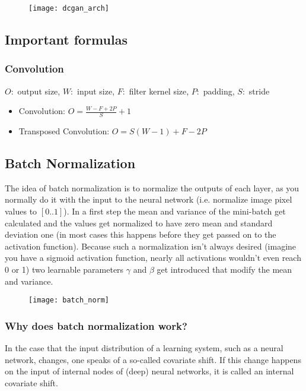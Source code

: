 \begin{figure}
	\centering
		\texttt{[image: dcgan\_arch]}
	\label{fig:dcgan_arch}
\end{figure}

\subsection{Important formulas}
\subsubsection{Convolution}
$O:$ output size, $W:$ input size, $F:$ filter kernel size, $P:$ padding, $S:$ stride
\begin{itemize}
	\item
		Convolution: $O = \frac{W - F + 2P}{S} + 1$
	\item
		Transposed Convolution: $O = S(W-1) + F - 2P$
\end{itemize}

\subsection{Batch Normalization}
The idea of batch normalization is to normalize the outputs of each layer, as you normally do it with the input to the neural network (i.e. normalize image pixel values to $[0..1]$). In a first step the mean and variance of the mini-batch get calculated and the values get normalized to have zero mean and standard deviation one (in most cases this happens before they get passed on to the activation function). Because such a normalization isn't always desired (imagine you have a sigmoid activation function, nearly all activations wouldn't even reach 0 or 1) two learnable parameters $\gamma$ and $\beta$ get introduced that modify the mean and variance.
\begin{figure}
	\centering
		\texttt{[image: batch\_norm]}
	\caption{}
	\label{fig:batch_norm}
\end{figure}

\subsubsection{Why does batch normalization work?}
In the case that the input distribution of a learning system, such as a neural network, changes, one speaks of a so-called covariate shift. If this change happens on the input of internal nodes of (deep) neural networks, it is called an internal covariate shift.

